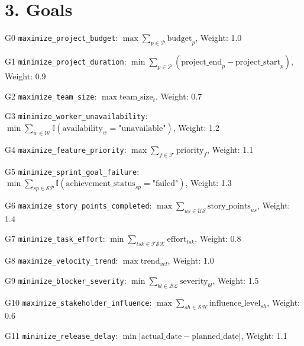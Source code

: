 \documentclass[12pt]{article}
\begin{document}
\section{3. Goals}
\item[G0] \texttt{maximize\_project\_budget}: 
      $ \max \sum_{p \in \mathcal{P}} \text{budget}_p $, Weight: 1.0
    
    \item[G1] \texttt{minimize\_project\_duration}: 
      $ \min \sum_{p \in \mathcal{P}} (\text{project\_end}_p - \text{project\_start}_p) $, Weight: 0.9
    
    \item[G2] \texttt{maximize\_team\_size}: 
      $ \max \text{team\_size}_t $, Weight: 0.7
    
    \item[G3] \texttt{minimize\_worker\_unavailability}: 
      $ \min \sum_{w \in \mathcal{W}} \mathbb{I}(\text{availability}_w = \text{"unavailable"}) $, Weight: 1.2
    
    \item[G4] \texttt{maximize\_feature\_priority}: 
      $ \max \sum_{f \in \mathcal{F}} \text{priority}_f $, Weight: 1.1
    
    \item[G5] \texttt{minimize\_sprint\_goal\_failure}: 
      $ \min \sum_{sp \in \mathcal{SP}} \mathbb{I}(\text{achievement\_status}_{sp} = \text{"failed"}) $, Weight: 1.3
    
    \item[G6] \texttt{maximize\_story\_points\_completed}: 
      $ \max \sum_{us \in \mathcal{US}} \text{story\_points}_{us} $, Weight: 1.4
    
    \item[G7] \texttt{minimize\_task\_effort}: 
      $ \min \sum_{tsk \in \mathcal{TSK}} \text{effort}_{tsk} $, Weight: 0.8
    
    \item[G8] \texttt{maximize\_velocity\_trend}: 
      $ \max \text{trend}_{vel} $, Weight: 1.0
    
    \item[G9] \texttt{minimize\_blocker\_severity}: 
      $ \min \sum_{bl \in \mathcal{BL}} \text{severity}_{bl} $, Weight: 1.5
    
    \item[G10] \texttt{maximize\_stakeholder\_influence}: 
      $ \max \sum_{sh \in \mathcal{SH}} \text{influence\_level}_{sh} $, Weight: 0.6
    
    \item[G11] \texttt{minimize\_release\_delay}: 
      $ \min |\text{actual\_date} - \text{planned\_date}| $, Weight: 1.1
    
\end{document}
